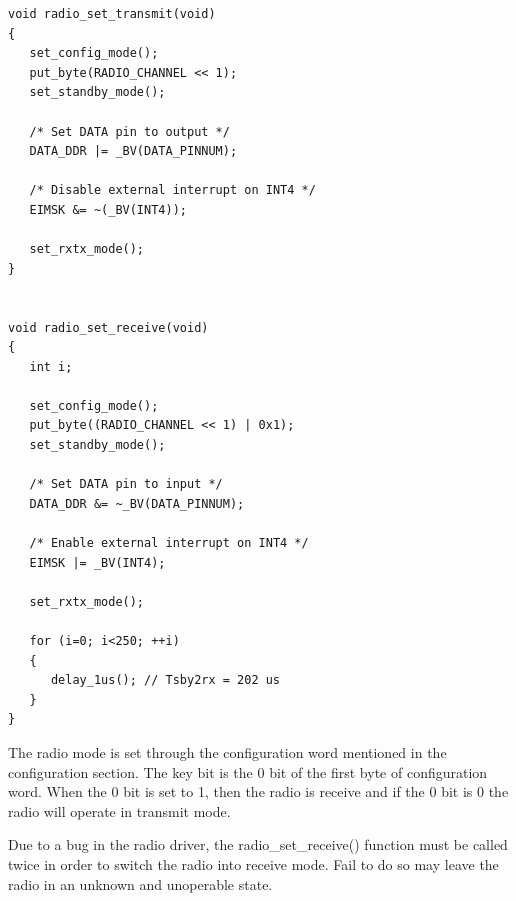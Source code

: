 \begin{lstlisting}[float=htb]
void radio_set_transmit(void)
{
   set_config_mode();
   put_byte(RADIO_CHANNEL << 1);
   set_standby_mode();

   /* Set DATA pin to output */
   DATA_DDR |= _BV(DATA_PINNUM);

   /* Disable external interrupt on INT4 */
   EIMSK &= ~(_BV(INT4));

   set_rxtx_mode();
} 


void radio_set_receive(void)
{
   int i;

   set_config_mode();
   put_byte((RADIO_CHANNEL << 1) | 0x1);
   set_standby_mode();

   /* Set DATA pin to input */
   DATA_DDR &= ~_BV(DATA_PINNUM);

   /* Enable external interrupt on INT4 */
   EIMSK |= _BV(INT4);

   set_rxtx_mode();

   for (i=0; i<250; ++i)
   {
      delay_1us(); // Tsby2rx = 202 us
   }
}
\end{lstlisting}

The radio mode is set through the configuration word mentioned in the configuration section. The key bit is the 0 bit of the first byte of configuration word. When the 0 bit is set to 1, then the radio is receive and if the 0 bit is 0 the radio will operate in transmit mode.

Due to a bug in the radio driver, the radio\_set\_receive() function must be called twice in order to switch the radio into receive mode. Fail to do so may leave the radio in an unknown and unoperable state.

